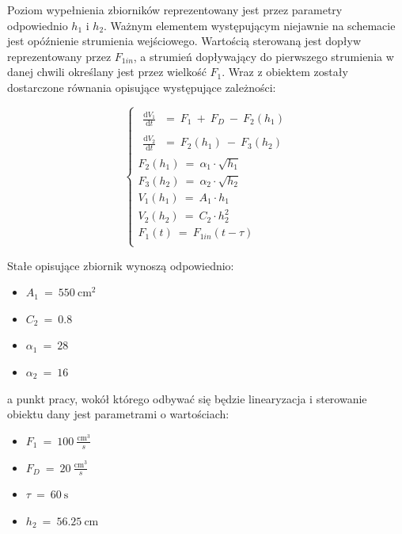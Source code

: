 \documentclass[a4paper,12pt]{article}
\begin{document}
\noindent Poziom wypełnienia zbiorników reprezentowany jest przez parametry odpowiednio $h_1$ i $h_2$.
Ważnym elementem występującym niejawnie na schemacie jest opóźnienie strumienia wejściowego.
Wartością sterowaną jest dopływ reprezentowany przez $F_{1in}$, a strumień dopływający do pierwszego strumienia w danej chwili określany jest przez wielkość $F_1$.
\newline
\newline
Wraz z obiektem zostały dostarczone równania opisujące występujące zależności:

\begin{equation}
   \left\lbrace
   \begin{array}{l}
      \begin{matrix}\frac{\text{d}V_1}{\text{d}t}\end{matrix} ~=~ F_1 ~+~ F_D ~-~ F_2(h_1)\\[0.2cm]
      \begin{matrix}\frac{\text{d}V_2}{\text{d}t}\end{matrix} ~=~ F_2(h_1) ~-~ F_3(h_2)\\[0.2cm]
      F_2(h_1) ~=~ \alpha_1 \cdot \sqrt{h_1} \\[0.2cm]
      F_3(h_2) ~=~ \alpha_2 \cdot \sqrt{h_2} \\[0.2cm]
      V_1(h_1) ~=~ A_1 \cdot h_1 \\[0.2cm]
      V_2(h_2) ~=~ C_2 \cdot h_2^2 \\[0.2cm]
      F_1(t) ~=~ F_{1in}(t-\tau) \\[0.2cm]
   \end{array}
   \right.
\end{equation}

\noindent Stałe opisujące zbiornik wynoszą odpowiednio:

\begin{itemize}
   \item $A_1 ~=~ 550~\text{cm}^2$
   \item $C_2 ~=~ 0.8$
   \item $\alpha_1 ~=~ 28$
   \item $\alpha_2 ~=~ 16$
\end{itemize}

\noindent a punkt pracy, wokół którego odbywać się będzie linearyzacja i sterowanie obiektu dany jest parametrami o wartościach:

\begin{itemize}
   \item $F_1 ~=~ 100~\frac{\text{cm}^3}{s}$
   \item $F_D ~=~ 20~\frac{\text{cm}^3}{s}$
   \item $\tau ~=~ 60~\text{s}$
   \item $h_2 ~=~ 56.25~\text{cm}$
\end{itemize}
\end{document}
